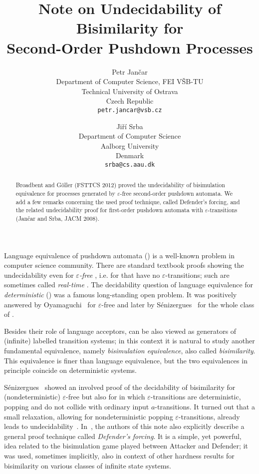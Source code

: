 \documentclass[11pt]{article}
\title{Note on Undecidability of Bisimilarity for \\ Second-Order
Pushdown Processes\\[5mm]}
\author{Petr Jan\v{c}ar \\[3mm] 
{\normalsize Department of Computer Science, FEI V\v{S}B-TU}\\
{\normalsize Technical University of Ostrava}\\
{\normalsize Czech Republic}\\
\texttt{petr.jancar@vsb.cz}
\and
Ji\v{r}\'{i} Srba \\[3mm] 
{\normalsize Department of Computer Science}\\
{\normalsize Aalborg University}\\ 
{\normalsize Denmark}\\
\texttt{srba@cs.aau.dk}}
\date{ }
\newcommand{\pda}{\text{PDA}\xspace}
\newcommand{\dpda}{\text{DPDA}\xspace}
\begin{document}
\maketitle

\vspace{-6mm}
\begin{abstract}
\noindent
Broadbent and G\"oller (FSTTCS 2012)
proved the undecidability of bisimulation equivalence for
processes generated by
$\varepsilon$-free second-order pushdown automata.
We add a few remarks concerning the
used proof technique, called Defender's forcing, 
and the related undecidability proof for  
first-order pushdown automata with $\varepsilon$-transitions 
(Jan\v{c}ar and Srba, JACM 2008).
\end{abstract}\vspace{3mm}

\noindent
Language equivalence of pushdown automata (\pda)
is a well-known problem in computer science community.
There are standard textbook proofs showing
the undecidability even for \emph{$\varepsilon$-free}
\pda, i.e. for \pda that have no $\varepsilon$-transitions;
such \pda are sometimes called \emph{real-time} \pda.
The decidability question of language equivalence 
for \emph{deterministic} \pda (\dpda)
was a famous
long-standing open problem. It was positively answered by 
Oyamaguchi~\cite{DBLP:journals/jacm/Oyamaguchi87}
for $\varepsilon$-free \dpda and later by 
S\'enizergues~\cite{Senizergues:TCS2001} for the whole class 
of \dpda.


Besides their role of language acceptors, 
\pda can be also viewed as generators of (infinite) labelled transition
systems; in this context it is natural to study another fundamental
equivalence, namely \emph{bisimulation equivalence}, also called
\emph{bisimilarity}. This equivalence
is finer than language equivalence, but the 
two equivalences in principle coincide on deterministic systems.

S\'enizergues~\cite{Senizergues:SIAM:05} 
showed an involved proof of the
decidability of bisimilarity for (nondeterministic)
$\varepsilon$-free \pda but also for \pda in which 
$\varepsilon$-transitions are deterministic, popping and 
do not collide with ordinary input $a$-transitions.
It turned out that 
a small relaxation, allowing for nondeterministic
popping $\varepsilon$-transitions, already leads to 
undecidability~\cite{DBLP:journals/jacm/JancarS08}.
In~\cite{DBLP:journals/jacm/JancarS08}, the authors of this note also
explicitly describe
a general proof technique called \emph{Defender's forcing}. 
It is a simple, yet powerful, idea related to the bisimulation game
played between Attacker and Defender; it was used, sometimes
implicitly, also in context of other hardness results
for bisimilarity on various classes of infinite state systems.
\end{document}
